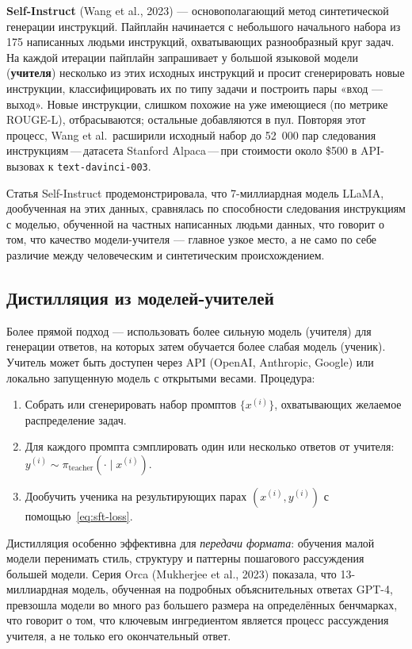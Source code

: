 \textbf{Self-Instruct} (Wang et al., 2023) --- основополагающий метод синтетической генерации инструкций. Пайплайн начинается с небольшого начального набора из 175 написанных людьми инструкций, охватывающих разнообразный круг задач. На каждой итерации пайплайн запрашивает у большой языковой модели (\textbf{учителя}) несколько из этих исходных инструкций и просит сгенерировать новые инструкции, классифицировать их по типу задачи и построить пары «вход --- выход». Новые инструкции, слишком похожие на уже имеющиеся (по метрике ROUGE-L), отбрасываются; остальные добавляются в пул. Повторяя этот процесс, Wang et al.\ расширили исходный набор до 52~000 пар следования инструкциям\,---\,датасета Stanford Alpaca\,---\,при стоимости около \$500 в API-вызовах к \texttt{text-davinci-003}.

Статья Self-Instruct продемонстрировала, что 7-миллиардная модель LLaMA, дообученная на этих данных, сравнялась по способности следования инструкциям с моделью, обученной на частных написанных людьми данных, что говорит о том, что качество модели-учителя --- главное узкое место, а не само по себе различие между человеческим и синтетическим происхождением.

\subsection{Дистилляция из моделей-учителей}

Более прямой подход --- использовать более сильную модель (учителя) для генерации ответов, на которых затем обучается более слабая модель (ученик). Учитель может быть доступен через API (OpenAI, Anthropic, Google) или локально запущенную модель с открытыми весами. Процедура:

\begin{enumerate}[leftmargin=*]
  \item Собрать или сгенерировать набор промптов $\{x^{(i)}\}$, охватывающих желаемое распределение задач.
  \item Для каждого промпта сэмплировать один или несколько ответов от учителя: $y^{(i)} \sim \pi_{\mathrm{teacher}}(\cdot \mid x^{(i)})$.
  \item Дообучить ученика на результирующих парах $(x^{(i)}, y^{(i)})$ с помощью~\eqref{eq:sft-loss}.
\end{enumerate}

Дистилляция особенно эффективна для \emph{передачи формата}: обучения малой модели перенимать стиль, структуру и паттерны пошагового рассуждения большей модели. Серия Orca (Mukherjee et al., 2023) показала, что 13-миллиардная модель, обученная на подробных объяснительных ответах GPT-4, превзошла модели во много раз большего размера на определённых бенчмарках, что говорит о том, что ключевым ингредиентом является процесс рассуждения учителя, а не только его окончательный ответ.

